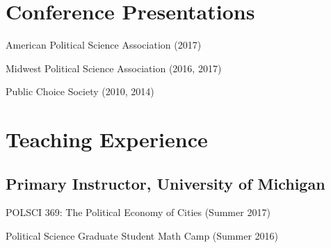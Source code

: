\documentclass[letterpaper]{article}
\renewenvironment{itemize}{
  \begin{list}{}{
    \setlength{\leftmargin}{1.5em}
  }
}{
  \end{list}
}
\begin{document}
\hrulefill

\section*{Conference Presentations} %
\begin{itemize}
\item American Political Science Association (2017)
\item Midwest Political Science Association (2016, 2017)
\item Public Choice Society (2010, 2014)
\end{itemize}

\hrulefill

\section*{Teaching Experience}

\subsection*{Primary Instructor, University of Michigan}
\begin{itemize}
\item POLSCI 369: The Political Economy of Cities  (Summer 2017)
\item Political Science Graduate Student Math Camp (Summer 2016)
\end{itemize}
\end{document}
